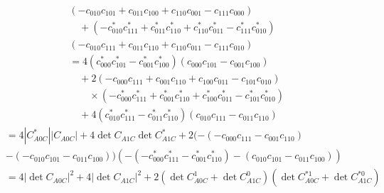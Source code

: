 \begin{equation}
\begin{aligned}
		&(-c_{010} c_{101}
		+ c_{011} c_{100}
		+ c_{110} c_{001}
		- c_{111} c_{000}) \\
		&\quad + (-c^{*}_{010} c^{*}_{111}
		+ c^{*}_{011} c^{*}_{110}
		+ c^{*}_{110} c^{*}_{011}
		- c^{*}_{111} c^{*}_{010})\\
		&(-c_{010} c_{111}
		+ c_{011} c_{110}
		+ c_{110} c_{011}
		- c_{111} c_{010})\\
		&= 4 (c^{*}_{000} c^{*}_{101}
		- c^{*}_{001} c^{*}_{100})
		(c_{000} c_{101}
		- c_{001} c_{100}) \\
		&\quad + 2 (-c_{000} c_{111}
		+ c_{001} c_{110}
		+ c_{100} c_{011}
		- c_{101} c_{010}) \\
		&\qquad \times
		(-c^{*}_{000} c^{*}_{111}
		+ c^{*}_{001} c^{*}_{110}
		+ c^{*}_{100} c^{*}_{011}
		- c^{*}_{101} c^{*}_{010}) \\
		&\quad + 4 (c^{*}_{010} c^{*}_{111}
		- c^{*}_{011} c^{*}_{110})
		(c_{010} c_{111}
		- c_{011} c_{110})
	\end{aligned}
\end{equation}
\begin{equation}
	\begin{aligned}
		&= 4 |C_{A0C}^{*}| |C_{A0C}|+ 4 \det C_{A1C} \det C_{A1C}^{*}+2(-(-c_{000}c_{111}-c_{001}c_{110})\\
		&-(-c_{010}c_{101}-c_{011}c_{100}))(-(-c^{*}_{000} c^{*}_{111}-c^{*}_{001} c^{*}_{110})-(c_{010}c_{101}-c_{011}c_{100}))\\
		&= 4 |\det C_{A0C}|^2
		+ 4 |\det C_{A1C}|^2
		+ 2 (\det C_{A0C}^1 + \det C_{A1C}^0)(\det C^{*1}_{A0C} + \det C^{*0}_{A1C})
	\end{aligned}
\end{equation}

\newpage

